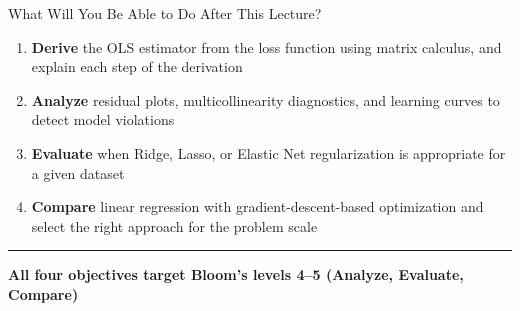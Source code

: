 \documentclass[8pt,aspectratio=169]{beamer}
\newcommand{\bottomnote}[1]{%
\vfill
\vspace{-2mm}
\textcolor{mllavender2}{\rule{\textwidth}{0.4pt}}
\vspace{1mm}
\footnotesize
\textbf{#1}
}
\newcommand{\highlight}[1]{\textcolor{mlorange}{\textbf{#1}}}
\begin{document}
\begin{frame}[t]{What Will You Be Able to Do After This Lecture?}
\small
\begin{enumerate}
\setlength{\itemsep}{8pt}
\item \highlight{Derive} the OLS estimator from the loss function using matrix calculus, and explain each step of the derivation
\item \highlight{Analyze} residual plots, multicollinearity diagnostics, and learning curves to detect model violations
\item \highlight{Evaluate} when Ridge, Lasso, or Elastic Net regularization is appropriate for a given dataset
\item \highlight{Compare} linear regression with gradient-descent-based optimization and select the right approach for the problem scale
\end{enumerate}

\bottomnote{All four objectives target Bloom's levels 4--5 (Analyze, Evaluate, Compare)}
\end{frame}
\end{document}
